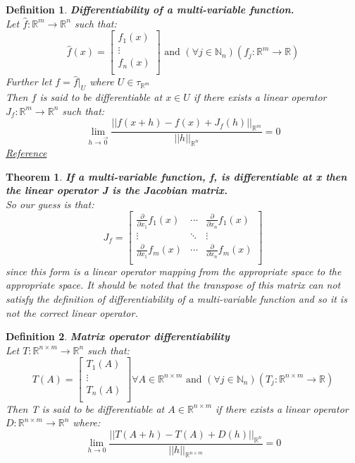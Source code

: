 \documentclass[12pt]{extarticle}
\theoremstyle{plain}
\newtheorem{thm}{Theorem}[section]
\theoremstyle{Definition}
\newtheorem{def.}{Definition}[section]
\theoremstyle{Definition}
\theoremstyle{plain}
\begin{document}
\newpage
\begin{def.} \textbf{Differentiability of a multi-variable function.} \\
	Let $\hat{f} : \mathbb{R}^m \to \mathbb{R}^n$ such that: \\ 
	\[
	\hat{f}(x) = 
	\begin{bmatrix}
	f_1(x) \\ 
	\vdots \\
	f_n(x) \\
	\end{bmatrix}
	\text{ and } 
	(\forall j \in \mathbb{N}_n)(f_j : \mathbb{R}^m \to \mathbb{R})
	\]
	Further let $f = \hat{f}|_U$ where $U \in \tau_{\mathbb{R}^m}$ \\ 
	Then $f$ is said to be differentiable at $x \in U$ if there exists a linear operator $J_f: \mathbb{R}^m \to \mathbb{R}^n$ such that: \\ 
	$$\lim_{h \to \vec{0}} \frac{||f(x + h) - f(x) + J_f(h)||_{\mathbb{R}^m}}{||h||_{\mathbb{R}^n}} = 0$$
	\href{https://en.wikipedia.org/wiki/Differentiable_function}{Reference}
\end{def.}
\begin{thm} \textbf{If a multi-variable function, f, is differentiable at x then the linear operator J is the Jacobian matrix.} \\ 
	So our guess is that: \\ 
	\[
	J_f = 
	\begin{bmatrix}
	\frac{\partial}{\partial x_1} f_1(x) & \cdots & \frac{\partial}{\partial x_n} f_1(x) \\ 
	\vdots & \ddots & \vdots \\ 
	\frac{\partial}{\partial x_1} f_m(x) & \cdots & \frac{\partial}{\partial x_n} f_m(x) \\ 
	\end{bmatrix}
	\]
	since this form is a linear operator mapping from the appropriate space to the appropriate space. It should be noted that the transpose of this matrix can not satisfy the definition of differentiability of a multi-variable function and so it is not the correct linear operator. 
\end{thm}
\begin{def.} \textbf{Matrix operator differentiability} \\ 
	Let $T : \mathbb{R}^{n\times m} \to \mathbb{R}^n$ such that: \\
	\[
	T(A) = 
	\begin{bmatrix}
	T_1(A) \\ 
	\vdots \\ 
	T_n(A) \\ 	
	\end{bmatrix}
	\forall A \in \mathbb{R}^{n\times m}
	\text{ and } (\forall j \in \mathbb{N}_n)(T_j : \mathbb{R}^{n \times m} \to \mathbb{R})
	\]
	Then T is said to be differentiable at $A \in \mathbb{R}^{n \times m}$ if there exists a linear operator $D : \mathbb{R}^{n \times m} \to \mathbb{R}^n$ where: \\ 
	$$\lim_{h \to 0} \frac{||T(A + h) - T(A) + D(h)||_{\mathbb{R}^n}}{||h||_{\mathbb{R}^{n\times m}}} = 0$$
\end{def.}
\end{document}
